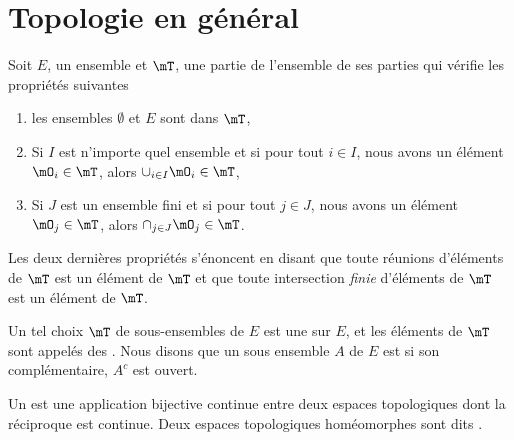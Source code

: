 
					\section{Topologie en général}

\begin{definition}		\label{DefTopologieGene}
Soit $E$, un ensemble et $\mT$, une partie de l'ensemble de ses parties qui vérifie les propriétés suivantes
\begin{enumerate}

\item
les ensembles $\emptyset$ et $E$ sont dans $\mT$,

\item
Si $I$ est n'importe quel ensemble et si pour tout $i\in I$, nous avons un élément $\mO_i\in\mT$, alors $\cup_{i\in I}\mO_i\in\mT$,

\item
Si $J$ est un ensemble fini et si pour tout $j\in J$, nous avons un élément $\mO_j\in\mT$, alors $\cap_{j\in J}\mO_j\in\mT$.

\end{enumerate}
Les deux dernières propriétés s'énoncent en disant que toute réunions d'éléments de $\mT$ est un élément de $\mT$ et que toute intersection \emph{finie} d'éléments de $\mT$ est un élément de $\mT$.

Un tel choix $\mT$ de sous-ensembles de $E$ est une   sur $E$, et les éléments de $\mT$ sont appelés des . Nous disons que un sous ensemble $A$ de $E$ est  si son complémentaire, $A^c$ est ouvert.
\end{definition}

\begin{definition}
    Un  est une application bijective continue entre deux espaces topologiques dont la réciproque est continue. Deux espaces topologiques homéomorphes sont dits .
\end{definition}

